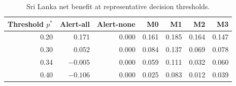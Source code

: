 \documentclass[11pt,a4paper]{article}
\begin{document}
\begin{table}[htbp]
\centering
\caption{Sri Lanka net benefit at representative decision thresholds.}
\label{tab:slthresh}
\small
\begin{tabular}{rrrrrrr}
\toprule
Threshold $p^*$ & Alert-all & Alert-none & M0 & M1 & M2 & M3 \\
\midrule
0.20 & 0.171 & 0.000 & 0.161 & 0.185 & 0.164 & 0.147 \\
0.30 & 0.052 & 0.000 & 0.084 & 0.137 & 0.069 & 0.078 \\
0.34 & $-0.005$ & 0.000 & 0.059 & 0.111 & 0.032 & 0.060 \\
0.40 & $-0.106$ & 0.000 & 0.025 & 0.083 & 0.012 & 0.039 \\
\bottomrule
\end{tabular}
\end{table}
\end{document}
